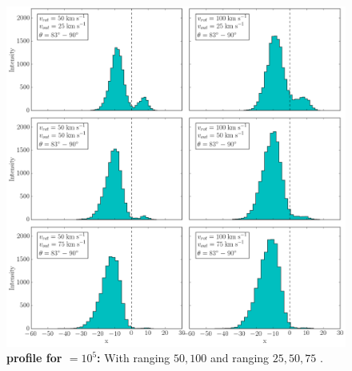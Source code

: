 \newpage

\begin{figure}[h!]
	\begin{center}
		\includegraphics[width=1\textwidth]{./figures/chapter3/2_tau10E6_phi83-90}
	\end{center}
	\caption{\textbf{\lya profile for \tauh$=10^5$:} With \vrot ranging $50,100$ \kms and \vout ranging $25,50,75$ \kms.
		\label{fig:2_tau10E6_phi83-90}}
\end{figure}

\newpage

